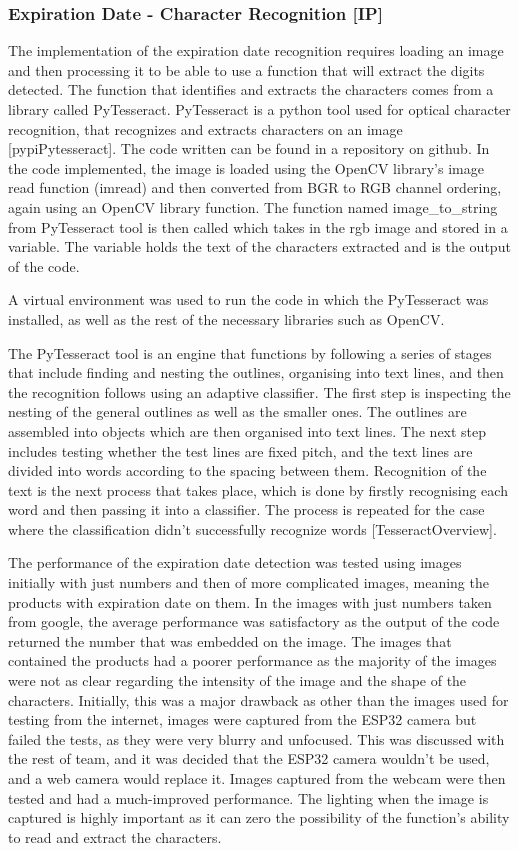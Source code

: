 \subsubsection{Expiration Date - Character Recognition [IP]}

The implementation of the expiration date recognition requires loading an image and then processing it to be able to use a function that will extract the digits detected.
The function that identifies and extracts the characters comes from a library called PyTesseract.
PyTesseract is a python tool used for optical character recognition, that recognizes and extracts characters on an image [pypiPytesseract].
The code written can be found in a repository on github.
In the code implemented, the image is loaded using the OpenCV library's image read function (imread) and then converted from BGR to RGB channel ordering, again using an OpenCV library function.
The function named image\_to\_string from PyTesseract tool is then called which takes in the rgb image and stored in a variable.
The variable holds the text of the characters extracted and is the output of the code.

A virtual environment was used to run the code in which the PyTesseract was installed, as well as the rest of the necessary libraries such as OpenCV.

The PyTesseract tool is an engine that functions by following a series of stages that include finding and nesting the outlines, organising into text lines, and then the recognition follows using an adaptive classifier.
The first step is inspecting the nesting of the general outlines as well as the smaller ones.
The outlines are assembled into objects which are then organised into text lines.
The next step includes testing whether the test lines are fixed pitch, and the text lines are divided into words according to the spacing between them.
Recognition of the text is the next process that takes place, which is done by firstly recognising each word and then passing it into a classifier.
The process is repeated for the case where the classification didn't successfully recognize words [TesseractOverview].

The performance of the expiration date detection was tested using images initially with just numbers and then of more complicated images, meaning the products with expiration date on them.
In the images with just numbers taken from google, the average performance was satisfactory as the output of the code returned the number that was embedded on the image.
The images that contained the products had a poorer performance as the majority of the images were not as clear regarding the intensity of the image and the shape of the characters.
Initially, this was a major drawback as other than the images used for testing from the internet, images were captured from the ESP32 camera but failed the tests, as they were very blurry and unfocused.
This was discussed with the rest of team, and it was decided that the ESP32 camera wouldn't be used, and a web camera would replace it.
Images captured from the webcam were then tested and had a much-improved performance.
The lighting when the image is captured is highly important as it can zero the possibility of the function's ability to read and extract the characters.

